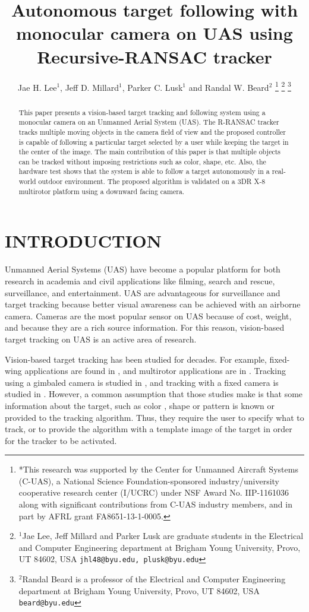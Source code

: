 \documentclass[letterpaper, 10 pt, conference]{ieeeconf}  %
\title{\LARGE \bf
	Autonomous target following with monocular camera on UAS using Recursive-RANSAC tracker
}
\author{Jae H. Lee$^{1}$, Jeff D. Millard$^{1}$, Parker C. Lusk$^{1}$ and Randal W. Beard$^{2}$%
\thanks{*This research was supported by the Center for Unmanned Aircraft Systems (C-UAS), a National Science Foundation-sponsored industry/university cooperative research center (I/UCRC) under NSF Award No. IIP-1161036 along with significant contributions from C-UAS industry members, and in part by AFRL grant FA8651-13-1-0005.}%
\thanks{$^{1}$Jae Lee, Jeff Millard and Parker Lusk are graduate students in the Electrical and Computer	Engineering department at Brigham Young University, Provo, UT 84602, USA {\tt\small jhl48@byu.edu, plusk@byu.edu}}%
\thanks{$^{2}$Randal Beard is a professor of the Electrical and Computer Engineering 
	department at Brigham Young University, Provo, UT 84602, USA {\tt\small beard@byu.edu}}%
}
\begin{document}
	
	\maketitle
	\thispagestyle{empty}
	\pagestyle{empty}
	
	
\begin{abstract}

This paper presents a vision-based target tracking and following system using a monocular camera on an Unmanned Aerial System (UAS). The R-RANSAC tracker tracks multiple moving objects in the camera field of view and the proposed controller is capable of following a particular target selected by a user while keeping the target in the center of the image. The main contribution of this paper is that multiple objects can be tracked without imposing restrictions such as color, shape, etc. Also, the hardware test shows that the system is able to follow a target autonomously in a real-world outdoor environment. The proposed algorithm is validated on a 3DR X-8 multirotor platform using a downward facing camera.
	
\end{abstract}


\section{INTRODUCTION}
	
Unmanned Aerial Systems (UAS) have become a popular platform for both research in academia and civil applications like filming, search and rescue, surveillance, and entertainment. UAS are advantageous for surveillance and target tracking because better visual awareness can be achieved with an airborne camera. Cameras are the most popular sensor on UAS because of cost, weight, and because they are a rich source information. For this reason, vision-based target tracking on UAS is an active area of research.

Vision-based target tracking has been studied for decades. For example, fixed-wing applications are found in \cite{Saunders2011, Rysdyk2006, Dobrokhodov2006, Qadir2011, Theodorakopoulos2008}, and multirotor applications are in \cite{Pestana2013, Thomas2017, Teuliere2011, Kim2013}. Tracking using a gimbaled camera is studied in \cite{Rysdyk2006, Dobrokhodov2006, Hurak2012}, and tracking with a fixed camera is studied in \cite{Saunders2011, Theodorakopoulos2008, Pestana2013, Thomas2017, Teuliere2011, Kim2013}. However, a common assumption that those studies make is that some information about the target, such as color \cite{Teuliere2011, Kim2013}, shape \cite{Thomas2017} or pattern \cite{Lee2012} is known or provided to the tracking algorithm. Thus, they require the user to specify what to track, or to provide the algorithm with a template image of the target in order for the tracker to be activated. 
\end{document}
